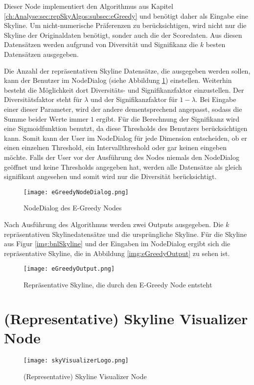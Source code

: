 Dieser Node implementiert den Algorithmus aus Kapitel \ref{ch:Analyse:sec:repSkyAlgos:subsec:eGreedy} und benötigt daher als Eingabe eine Skyline. Um nicht-numerische Präferenzen zu berücksichtigen, wird nicht nur die Skyline der Originaldaten benötigt, sonder auch die der Scoredaten. Aus diesen Datensätzen werden aufgrund von Diversität und Signifikanz die $k$ besten Datensätzen ausgegeben.

Die Anzahl der repräsentativen Skyline Datensätze, die ausgegeben werden sollen, kann der Benutzer im NodeDialog (siehe Abbildung \ref{img:eGreedyNodeDialog}) einstellen. Weiterhin besteht die Möglichkeit dort Diversitäts- und Signifikanzfaktor einzustellen. Der Diversitätsfaktor steht für $\lambda$ und der Signifikanzfaktor für $1-\lambda$. Bei Eingabe einer dieser Parameter, wird der andere dementsprechend angepasst, sodass die Summe beider Werte immer $1$ ergibt.
Für die Berechnung der Signifikanz wird eine Sigmoidfunktion benutzt, da diese Thresholds des Benutzers berücksichtigen kann. Somit kann der User im NodeDialog für jede Dimension entscheiden, ob er einen einzelnen Threshold, ein Intervallthreshold oder gar keinen eingeben möchte. Falls der User vor der Ausführung des Nodes niemals den NodeDialog geöffnet und keine Thresholds angegeben hat, werden alle Datensätze als gleich signifikant angesehen und somit wird nur die Diversität berücksichtigt. 

\begin{figure}[H]
	\centering
	\texttt{[image: eGreedyNodeDialog.png]}
	\caption{NodeDialog des E-Greedy Nodes}
	\label{img:eGreedyNodeDialog}
\end{figure}

Nach Ausführung des Algorithmus werden zwei Outputs ausgegeben. Die $k$ repräsentativen Skylinedatensätze und die ursprüngliche Skyline. Für die Skyline aus Figur \ref{img:bnlSkyline} und der Eingaben im NodeDialog ergibt sich die repräsentative Skyline, die in Abbildung \ref{img:eGreedyOutput} zu sehen ist.

\begin{figure}[H]
	\centering
	\texttt{[image: eGreedyOutput.png]}
	\caption{Repräsentative Skyline, die durch den E-Greedy Node entsteht}
	\label{img:eGreedyOut}
\end{figure}
\section{(Representative) Skyline Visualizer Node}
\label{ch:Implementierung:sec:skyVisualizer}
\begin{figure}[H]
	\centering
	\texttt{[image: skyVisualizerLogo.png]}
	\caption{(Representative) Skyline Visualizer Node}
	\label{img:skyVisualizerLogo}
\end{figure}

